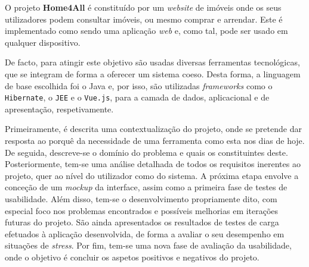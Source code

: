 
O projeto \textbf{Home4All} é constituído por um \textit{website} de imóveis
onde os seus utilizadores podem consultar imóveis, ou mesmo comprar e arrendar.
Este é implementado como sendo uma aplicação \textit{web} e, como tal, pode ser
usado em qualquer dispositivo.

De facto, para atingir este objetivo são usadas diversas ferramentas
tecnológicas, que se integram de forma a oferecer um sistema coeso. Desta forma,
a linguagem de base escolhida foi o Java e, por isso, são utilizadas
\textit{frameworks} como o \texttt{Hibernate}, o \texttt{JEE} e o \texttt{Vue.js}, para a camada de dados, aplicacional e de
apresentação, respetivamente. 

Primeiramente, é descrita uma contextualização do projeto, onde se pretende dar
resposta ao porquê da necessidade de uma ferramenta como esta nos dias de hoje.
De seguida, descreve-se o domínio do problema e quais os constituintes deste.
Posteriormente, tem-se uma análise detalhada de todos os requisitos inerentes ao
projeto, quer ao nível do utilizador como do sistema. A próxima etapa envolve a
conceção de um \textit{mockup} da interface, assim como a primeira fase de
testes de usabilidade. Além disso, tem-se o desenvolvimento propriamente dito,
com especial foco nos problemas encontrados e possíveis melhorias em iterações
futuras do projeto. São ainda apresentados os resultados de testes de carga efetuados à aplicação desenvolvida, de forma a avaliar o seu desempenho em situações de \textit{stress}. Por fim, tem-se uma nova fase de avaliação da usabilidade,
onde o objetivo é concluir os aspetos positivos e negativos do projeto.
